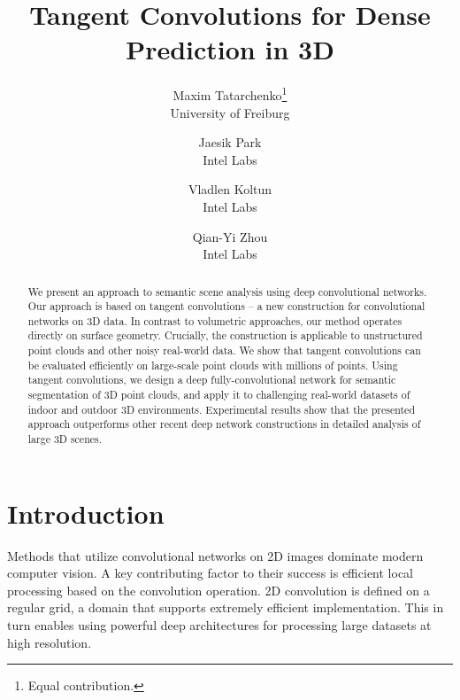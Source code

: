 \documentclass[10pt,twocolumn,letterpaper]{article}
\newcommand*\samethanks[1][\value{footnote}]{\footnotemark[#1]}
\begin{document}
\title{Tangent Convolutions for Dense Prediction in 3D}

\author{Maxim Tatarchenko\thanks{Equal contribution.}\\
University of Freiburg\\
\and
Jaesik Park\samethanks{}\\
Intel Labs\\
\and
Vladlen Koltun\\
Intel Labs\\
\and
Qian-Yi Zhou\\
Intel Labs\\
}

\maketitle


\begin{abstract}
We present an approach to semantic scene analysis using deep convolutional networks. Our approach is based on tangent convolutions -- a new construction for convolutional networks on 3D data. In contrast to volumetric approaches, our method operates directly on surface geometry. Crucially, the construction is applicable to unstructured point clouds and other noisy real-world data. We show that tangent convolutions can be evaluated efficiently on large-scale point clouds with millions of points. Using tangent convolutions, we design a deep fully-convolutional network for semantic segmentation of 3D point clouds, and apply it to challenging real-world datasets of indoor and outdoor 3D environments. Experimental results show that the presented approach outperforms other recent deep network constructions in detailed analysis of large 3D scenes.
\end{abstract}





\section{Introduction}
\label{sec:introduction}










Methods that utilize convolutional networks on 2D images dominate modern computer vision.
A key contributing factor to their success is efficient local processing based on the convolution operation.
2D convolution is defined on a regular grid, a domain that supports extremely efficient implementation.
This in turn enables using powerful deep architectures for processing large datasets at high resolution.
\end{document}
